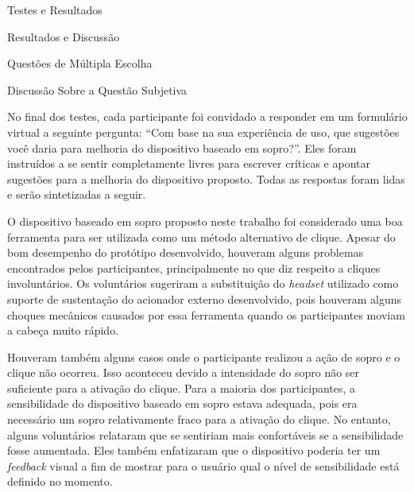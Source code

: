 \begin{chapter}{Testes e Resultados}
\begin{section}{Resultados e Discussão}
\begin{subsection}{Questões de Múltipla Escolha}
\end{subsection}

\begin{subsection}{Discussão Sobre a Questão Subjetiva}

No final dos testes, cada participante foi convidado a responder em um
formulário virtual a seguinte pergunta: ``Com base na sua experiência de uso,
que sugestões você daria para melhoria do dispositivo baseado em sopro?''. Eles 
foram instruídos a se sentir completamente livres para escrever críticas e 
apontar sugestões para a melhoria do dispositivo proposto. Todas as respostas
foram lidas e serão sintetizadas a seguir.


O dispositivo baseado em sopro proposto neste trabalho foi considerado uma boa
ferramenta para ser utilizada como um método alternativo de clique. Apesar do
bom desempenho do protótipo desenvolvido, houveram alguns problemas encontrados
pelos participantes, principalmente no que diz respeito a cliques involuntários.
Os voluntários sugeriram a substituição do \textit{headset} utilizado como
suporte de sustentação do acionador externo desenvolvido, pois houveram alguns
choques mecânicos causados por essa ferramenta quando os participantes moviam
a cabeça muito rápido.

Houveram também alguns casos onde o participante realizou a ação de sopro e o
clique não ocorreu. Isso aconteceu devido a intensidade do sopro não ser
suficiente para a ativação do clique. Para a maioria dos participantes, a
sensibilidade do dispositivo baseado em sopro estava adequada, pois era
necessário um sopro relativamente fraco para a ativação do clique. No entanto,
alguns voluntários relataram que se sentiriam mais confortáveis se a
sensibilidade fosse aumentada. %
Eles também enfatizaram que o  dispositivo poderia ter um \textit{feedback}
visual a fim de mostrar para o usuário qual o nível de sensibilidade está
definido no momento.


\end{subsection}

\end{section}

\end{chapter}
